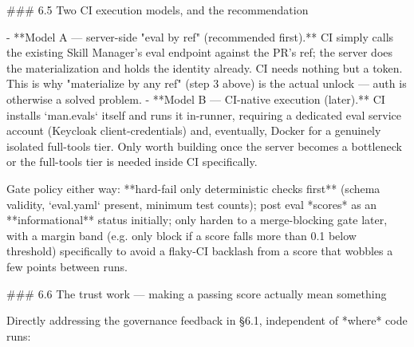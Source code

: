 ### 6.5 Two CI execution models, and the recommendation

- **Model A — server-side "eval by ref" (recommended first).** CI simply calls the existing Skill Manager's eval endpoint against the PR's ref; the server does the materialization and holds the identity already. CI needs nothing but a token. This is why "materialize by any ref" (step 3 above) is the actual unlock — auth is otherwise a solved problem.
- **Model B — CI-native execution (later).** CI installs `man.evals` itself and runs it in-runner, requiring a dedicated eval service account (Keycloak client-credentials) and, eventually, Docker for a genuinely isolated full-tools tier. Only worth building once the server becomes a bottleneck or the full-tools tier is needed inside CI specifically.

Gate policy either way: **hard-fail only deterministic checks first** (schema validity, `eval.yaml` present, minimum test counts); post eval *scores* as an **informational** status initially; only harden to a merge-blocking gate later, with a margin band (e.g. only block if a score falls more than 0.1 below threshold) specifically to avoid a flaky-CI backlash from a score that wobbles a few points between runs.

### 6.6 The trust work — making a passing score actually mean something

Directly addressing the governance feedback in §6.1, independent of *where* code runs:

